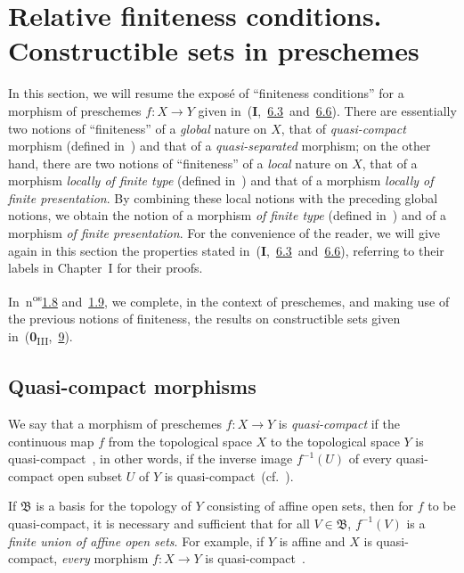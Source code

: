 \section{Relative finiteness conditions. Constructible sets in preschemes}
\label{section:IV.1}

In this section, we will resume the expos\'e of ``finiteness conditions'' for a morphism of preschemes $f:X\to Y$ given in~(\textbf{I},~\hyperref[subsection:I.6.3]{6.3}~and~\hyperref[subsection:I.6.6]{6.6}).
There are essentially two notions of ``finiteness'' of a \emph{global} nature on $X$, that of \emph{quasi-compact} morphism (defined in~) and that of a \emph{quasi-separated} morphism; on the other hand, there are two notions of ``finiteness'' of a \emph{local} nature on $X$, that of a morphism \emph{locally of finite type} (defined in~) and that of a morphism \emph{locally of finite presentation}.
By combining these local notions with the preceding global notions, we obtain the notion of a morphism \emph{of finite type} (defined in~) and of a morphism \emph{of finite presentation}.
For the convenience of the reader, we will give again in this section the properties stated in~(\textbf{I},~\hyperref[subsection:I.6.3]{6.3}~and~\hyperref[subsection:I.6.6]{6.6}), referring to their labels in Chapter~I for their proofs.

In~n\textsuperscript{os}\hyperref[subsection:IV.1.8]{1.8} and~\hyperref[subsection:IV.1.9]{1.9}, we complete, in the context of preschemes, and making use of the previous notions of finiteness, the results on constructible sets given in~(\textbf{0}\textsubscript{III},~\textsection\hyperref[section:0.9]{9}).

\subsection{Quasi-compact morphisms}
\label{subsection:IV.1.1}

\begin{definition}[1.1.1]
\label{IV.1.1.1}
We say that a morphism of preschemes $f:X\to Y$ is \emph{quasi-compact} if the continuous map $f$ from the topological space $X$ to the topological space $Y$ is quasi-compact~, in other words, if the inverse image $f^{-1}(U)$ of every quasi-compact open subset $U$ of $Y$ is quasi-compact~(cf.~).
\end{definition}

If $\mathfrak{B}$ is a basis for the topology of $Y$ consisting of affine open sets, then for $f$ to be quasi-compact, it is necessary and sufficient that for all $V\in\mathfrak{B}$, $f^{-1}(V)$ is a \emph{finite union of affine open sets}.
For example, if $Y$ is affine and $X$ is quasi-compact, \emph{every} morphism $f:X\to Y$ is quasi-compact~.

